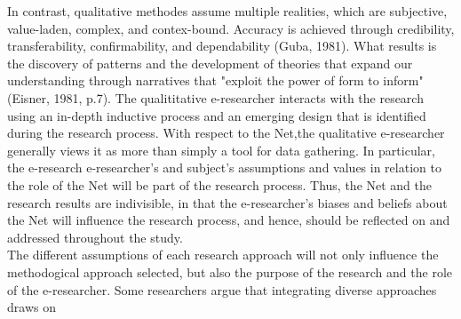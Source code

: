 \documentclass{book}
\begin{document}
In contrast, qualitative methodes assume multiple realities, which are subjective, value-laden, complex, and contex-bound. Accuracy is achieved through credibility, transferability, confirmability, and dependability (Guba, 1981). What results is the discovery of patterns and the development of theories that expand our understanding through narratives that "exploit the power of form to inform" (Eisner, 1981, p.7). The qualititative e-researcher interacts with the research using an in-depth inductive process and an emerging design that is identified during the research process. With respect to the Net,the qualitative e-researcher generally views it as more than simply a tool for data gathering. In particular, the e-research e-researcher's and subject's assumptions and values in relation to the role of the Net will be part of the research process. Thus, the Net and the research results are indivisible, in that the e-researcher's biases and beliefs about the Net will influence the research process, and hence, should be reflected on and addressed throughout the study.
\\\hspace*{0.5cm} The different assumptions of each research approach will not only influence the methodogical approach selected, but also the purpose of the research and the role of the e-researcher. Some researchers argue that integrating diverse approaches draws on
\end{document}
